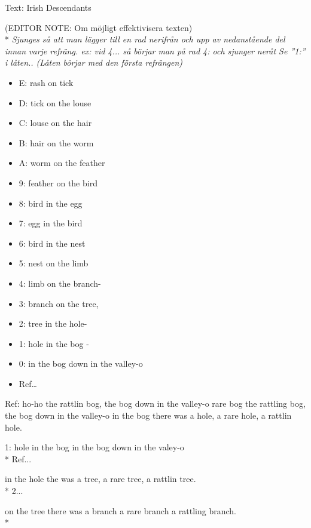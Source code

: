 \begin{SongText}
\begin{SongInfo}
    Text: Irish Descendants
\end{SongInfo}
\begin{SongVerse}
(EDITOR NOTE: Om möjligt effektivisera texten)\\*%
\emph{Sjunges så att man lägger till en rad nerifrån och upp av
nedanstående del innan varje refräng. ex: vid 4... så börjar man
på rad 4: och sjunger neråt Se ”1:” i låten.. (Låten börjar med
den första refrängen)}
\begin{itemize}
    \item E: rash on tick
    \item D: tick on the louse
    \item C: louse on the hair
    \item B: hair on the worm
    \item A: worm on the feather
    \item 9: feather on the bird
    \item 8: bird in the egg
    \item 7: egg in the bird
    \item 6: bird in the nest
    \item 5: nest on the limb
    \item 4: limb on the branch-
    \item 3: branch on the tree,
    \item 2: tree in the hole-
    \item 1: hole in the bog -
    \item 0: in the bog down in the valley-o
    \item Ref…
\end{itemize}
Ref:
ho-ho the rattlin bog, the bog down in the valley-o
rare bog the rattling bog, the bog down in the valley-o
in the bog there was a hole, a rare hole, a rattlin hole.
\end{SongVerse}
\begin{SongVerse}
1:
hole in the bog in the bog down in the valey-o\\*%
Ref... 
\end{SongVerse}
\begin{SongVerse}
in the hole the was a tree, a rare tree, a rattlin tree.\\*%
2...
\end{SongVerse}
\begin{SongVerse}
on the tree there was a branch a rare branch a rattling branch.\\*%

\end{SongVerse}
\end{SongText}
